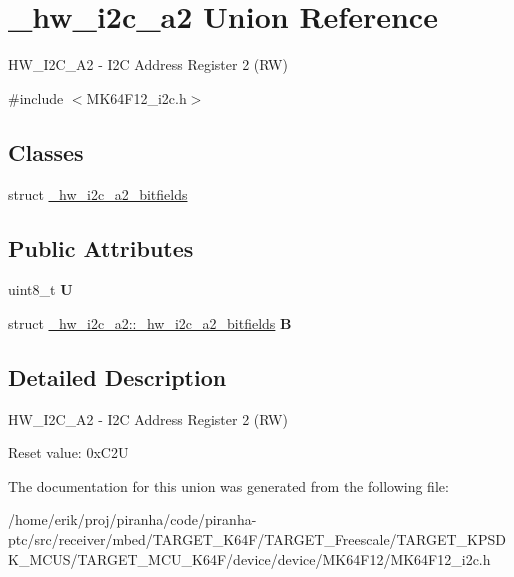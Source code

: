 \hypertarget{union__hw__i2c__a2}{}\section{\+\_\+hw\+\_\+i2c\+\_\+a2 Union Reference}
\label{union__hw__i2c__a2}


H\+W\+\_\+\+I2\+C\+\_\+\+A2 -\/ I2C Address Register 2 (RW)  




{\ttfamily \#include $<$M\+K64\+F12\+\_\+i2c.\+h$>$}

\subsection*{Classes}
\begin{DoxyCompactItemize}
\item 
struct \hyperlink{struct__hw__i2c__a2_1_1__hw__i2c__a2__bitfields}{\+\_\+hw\+\_\+i2c\+\_\+a2\+\_\+bitfields}
\end{DoxyCompactItemize}
\subsection*{Public Attributes}
\begin{DoxyCompactItemize}
\item 
uint8\+\_\+t {\bfseries U}\hypertarget{union__hw__i2c__a2_aaa1ee816964d102ffb7dc0a44793c9bf}{}\label{union__hw__i2c__a2_aaa1ee816964d102ffb7dc0a44793c9bf}

\item 
struct \hyperlink{struct__hw__i2c__a2_1_1__hw__i2c__a2__bitfields}{\+\_\+hw\+\_\+i2c\+\_\+a2\+::\+\_\+hw\+\_\+i2c\+\_\+a2\+\_\+bitfields} {\bfseries B}\hypertarget{union__hw__i2c__a2_aab62eebd26cbd08309c34c9e1aea2295}{}\label{union__hw__i2c__a2_aab62eebd26cbd08309c34c9e1aea2295}

\end{DoxyCompactItemize}


\subsection{Detailed Description}
H\+W\+\_\+\+I2\+C\+\_\+\+A2 -\/ I2C Address Register 2 (RW) 

Reset value\+: 0x\+C2U 

The documentation for this union was generated from the following file\+:\begin{DoxyCompactItemize}
\item 
/home/erik/proj/piranha/code/piranha-\/ptc/src/receiver/mbed/\+T\+A\+R\+G\+E\+T\+\_\+\+K64\+F/\+T\+A\+R\+G\+E\+T\+\_\+\+Freescale/\+T\+A\+R\+G\+E\+T\+\_\+\+K\+P\+S\+D\+K\+\_\+\+M\+C\+U\+S/\+T\+A\+R\+G\+E\+T\+\_\+\+M\+C\+U\+\_\+\+K64\+F/device/device/\+M\+K64\+F12/M\+K64\+F12\+\_\+i2c.\+h\end{DoxyCompactItemize}
